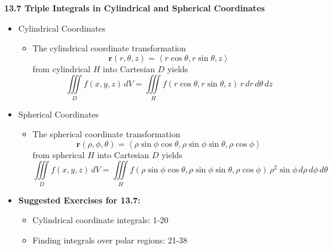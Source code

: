 \documentclass[12pt]{article}
\renewcommand{\vec}[1]{\mathbf{#1}}
\newcommand{\dvar}[1]{\,d{#1}}
\renewcommand{\d}[1]{\dvar{#1}}
\newcommand{\<}{\left<}
\renewcommand{\>}{\right>}
\begin{document}
  \newpage
  
  \centerline{\bf 13.7 Triple Integrals in Cylindrical and Spherical Coordinates}
  
  \begin{itemize}
  
  \item Cylindrical Coordinates
    \begin{itemize}
    \item The cylindrical coordinate transformation \[\vec{r}(r,\theta,z) = \<r\cos\theta, r\sin\theta, z\>\] from cylindrical $H$ into Cartesian $D$ yields \[\iiint\limits_D f(x,y,z)\d{V} = \iiint\limits_H f(r\cos\theta,r\sin\theta,z)\,r\d{r}\d{\theta}\d{z}\]
    \end{itemize}
  
  \item Spherical Coordinates
    \begin{itemize}
    \item The spherical coordinate transformation \[\vec{r}(\rho,\phi,\theta)=\<\rho\sin\phi\cos\theta, \rho\sin\phi\sin\theta, \rho\cos\phi\>\] from spherical $H$ into Cartesian $D$ yields \[\iiint\limits_D f(x,y,z)\, dV = \iiint\limits_H f(\rho\sin\phi\cos\theta,\rho\sin\phi\sin\theta,\rho\cos\phi) \,\rho^2\sin\phi\dvar{\rho}\dvar{\phi}\dvar{\theta} \]
    \end{itemize}
      
  \item \textbf{Suggested Exercises for 13.7:}
  
    \begin{itemize}
    \item Cylindrical coordinate integrals: 1-20
    \item Finding integrals over polar regions: 21-38
    \end{itemize}
  
  \end{itemize}
  
  
  
  
  
  
\end{document}
